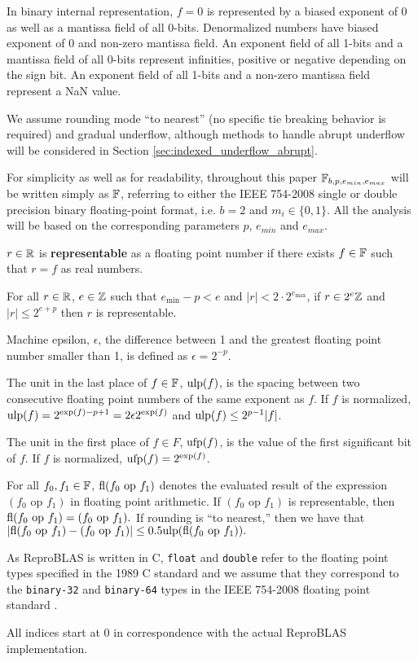   In binary internal representation, $f=0$ is represented by a biased exponent of $0$
  as well as a mantissa field of all 0-bits.
  Denormalized numbers have biased exponent of $0$ and non-zero mantissa field.
  An exponent field of all 1-bits and a mantissa field of all 0-bits
  represent infinities, positive or negative depending on the sign bit.
  An exponent field of all 1-bits and a non-zero mantissa field
  represent a NaN value.

  We assume rounding mode ``to nearest'' (no specific tie
  breaking behavior is required) and gradual underflow, although
  methods to handle abrupt underflow will be considered in Section
  \ref{sec:indexed_underflow_abrupt}.

  For simplicity as well as for readability, throughout this paper
  $\mathbb{F}_{b,p,e_{min},e_{max}}$ will be written simply as $\mathbb{F}$, referring to either
  the IEEE 754-2008 single or double precision binary floating-point format,
  i.e. $b=2$ and $m_i \in \{0, 1\}$.
  All the analysis will be based on the corresponding parameters $p$, $e_{min}$
  and $e_{max}$.

  $r \in \mathbb{R}$ is \textbf{representable} as a floating point number if there
  exists $f \in \mathbb{F}$ such that $r = f$ as real numbers.

  For all $r \in \mathbb{R}$, $e \in \mathbb{Z}$ such that $e_{\min} - p < e$ and $|r| < 2
  \cdot 2^{e_{\max}}$, if $r \in 2^e\mathbb{Z}$ and $|r| \leq 2^{e + p}$ then $r$ is
  representable.

  Machine epsilon, $\epsilon$, the difference between 1 and the greatest
  floating point number smaller than 1, is defined as $\epsilon = 2^{-p}$.

  The unit in the last place of $f \in \mathbb{F}$, $\text{ulp}(f)$, is the spacing between
  two consecutive floating point numbers of the same exponent as $f$. If $f$ is
  normalized, $\text{ulp}(f) = 2^{\text{exp}(f) - p + 1} = 2  \epsilon  2^{\text{exp}(f)}$ and
  $\text{ulp}(f) \leq 2^{p - 1}|f|$.

  The unit in the first place of $f \in F$, $\text{ufp}(f)$, is the value of the
  first significant bit of $f$. If $f$ is normalized, $\text{ufp}(f) = 2^{\text{exp}(f)}$.

  For all $f_0, f_1 \in \mathbb{F}$, $\text{fl}(f_0 \text{ op } f_1)$ denotes the evaluated
  result of the expression $(f_0 \text{ op } f_1)$ in floating point
  arithmetic. If $(f_0 \text{ op } f_1)$ is representable, then
  \(
    \text{fl}(f_0 \text{ op } f_1) = (f_0 \text{ op } f_1).
  \)
  If rounding is ``to nearest,'' then we have that
  \(
    |\text{fl}(f_0 \text{ op } f_1) - (f_0 \text{ op } f_1)| \leq 0.5\text{ulp}(\text{fl}(f_0 \text{ op } f_1)).
  \)

  As ReproBLAS is written in C, \texttt{float} and \texttt{double} refer to the
  floating point types specified in the 1989 C standard \cite{c89} and we
  assume that they correspond to the \texttt{binary-32} and \texttt{binary-64}
  types in the IEEE 754-2008 floating point standard \cite{ieee754}.

  All indices start at $0$ in correspondence with the actual ReproBLAS implementation.

